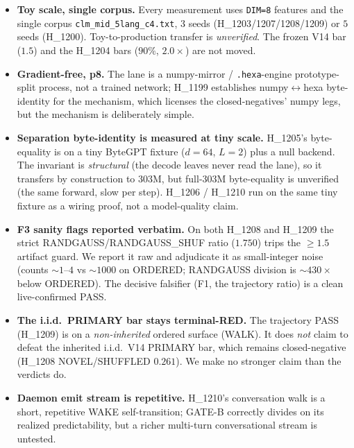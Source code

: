 \documentclass[11pt,a4paper]{article}
\begin{document}
\begin{itemize}\itemsep0.3em
\item \textbf{Toy scale, single corpus.} Every measurement uses \verb|DIM=8|
      features and the single corpus \verb|clm_mid_5lang_c4.txt|, $3$ seeds
      (H\_1203/1207/1208/1209) or $5$ seeds (H\_1200). Toy-to-production
      transfer is \emph{unverified}. The frozen V14 bar ($1.5$) and the H\_1204
      bars ($90\%$, $2.0\times$) are not moved.
\item \textbf{Gradient-free, p8.} The lane is a numpy-mirror /
      \texttt{.hexa}-engine prototype-split process, not a trained network;
      H\_1199 establishes numpy$\leftrightarrow$hexa byte-identity for the
      mechanism, which licenses the closed-negatives' numpy legs, but the
      mechanism is deliberately simple.
\item \textbf{Separation byte-identity is measured at tiny scale.} H\_1205's
      byte-equality is on a tiny ByteGPT fixture ($d=64$, $L=2$) plus a null
      backend. The invariant is \emph{structural} (the decode leaves never read
      the lane), so it transfers by construction to $303$M, but full-$303$M
      byte-equality is unverified (the same forward, slow per step). H\_1206 /
      H\_1210 run on the same tiny fixture as a wiring proof, not a model-quality
      claim.
\item \textbf{F3 sanity flags reported verbatim.} On both H\_1208 and H\_1209
      the strict RANDGAUSS/RANDGAUSS\_SHUF ratio ($1.750$) trips the
      $\ge 1.5$ artifact guard. We report it raw and adjudicate it as
      small-integer noise (counts $\sim 1$--$4$ vs $\sim 1000$ on ORDERED;
      RANDGAUSS division is $\sim 430\times$ below ORDERED). The decisive
      falsifier (F1, the trajectory ratio) is a clean live-confirmed PASS.
\item \textbf{The i.i.d.\ PRIMARY bar stays terminal-RED.} The trajectory PASS
      (H\_1209) is on a \emph{non-inherited} ordered surface (WALK). It does
      \emph{not} claim to defeat the inherited i.i.d.\ V14 PRIMARY bar, which
      remains closed-negative (H\_1208 NOVEL/SHUFFLED $0.261$). We make no
      stronger claim than the verdicts do.
\item \textbf{Daemon emit stream is repetitive.} H\_1210's conversation walk is
      a short, repetitive WAKE self-transition; GATE-B correctly divides on its
      realized predictability, but a richer multi-turn conversational stream is
      untested.
\end{itemize}
\end{document}
